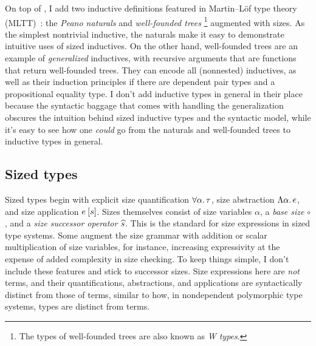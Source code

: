 On top of \GCC, I add two inductive definitions featured in Martin--L\"of type theory (MLTT)~\citep{MLTT}:
the \emph{Peano naturals} and \emph{well-founded trees}\punctstack{,}%
\footnote{The types of well-founded trees are also known as \emph{W types}.}
augmented with sizes.
As the simplest nontrivial inductive,
the naturals make it easy to demonstrate intuitive uses of sized inductives.
On the other hand, well-founded trees are an example of \emph{generalized} inductives,
with recursive arguments that are functions that return well-founded trees.
They can encode all (nonnested) inductives,
as well as their induction principles \citep{whynotW} if there are dependent pair types
and a propositional equality type.
I don't add inductive types in general in their place
because the syntactic baggage that comes with handling the generalization
obscures the intuition behind sized inductive types and the syntactic model,
while it's easy to see how one \emph{could} go from the naturals and well-founded trees
to inductive types in general.

\subsection{Sized types}\label{sec:sized-types}

Sized types begin with explicit size quantification $\forall \alpha \mathpunct{.} \tau$,
size abstraction $\Lambda \alpha \mathpunct{.} e$, and size application $\App{e}{s}$.
Sizes themselves consist of size variables $\alpha$, a \emph{base size} $\circ$,
and a \emph{size successor operator} $\widehat{s}$.
This is the standard for size expressions in sized type systems.
Some augment the size grammar with addition or scalar multiplication of size variables,
for instance, increasing expressivity at the expense of added complexity in size checking.
To keep things simple, I don't include these features and stick to successor sizes.
Size expressions here are \emph{not} terms,
and their quantifications, abstractions, and applications
are syntactically distinct from those of terms,
similar to how, in nondependent polymorphic type systems,
types are distinct from terms.

